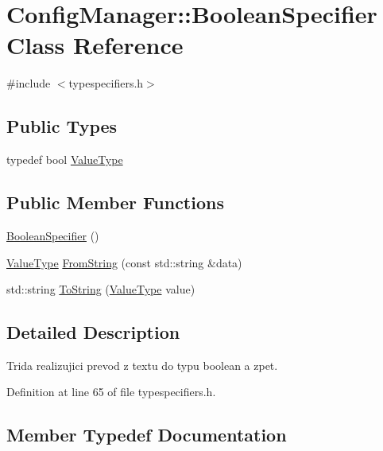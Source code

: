 \hypertarget{class_config_manager_1_1_boolean_specifier}{}\section{Config\+Manager\+:\+:Boolean\+Specifier Class Reference}
\label{class_config_manager_1_1_boolean_specifier}


{\ttfamily \#include $<$typespecifiers.\+h$>$}

\subsection*{Public Types}
\begin{DoxyCompactItemize}
\item 
typedef bool \hyperlink{class_config_manager_1_1_boolean_specifier_a765f3a2d8461a647ba1a84434665b54b}{Value\+Type}
\end{DoxyCompactItemize}
\subsection*{Public Member Functions}
\begin{DoxyCompactItemize}
\item 
\hyperlink{class_config_manager_1_1_boolean_specifier_ab8c8434a5de2cccb032cb6c7fbf3ae1c}{Boolean\+Specifier} ()
\item 
\hyperlink{class_config_manager_1_1_boolean_specifier_a765f3a2d8461a647ba1a84434665b54b}{Value\+Type} \hyperlink{class_config_manager_1_1_boolean_specifier_aa2964b687c6614053a9441b8f16eadcd}{From\+String} (const std\+::string \&data)
\item 
std\+::string \hyperlink{class_config_manager_1_1_boolean_specifier_a79947088ce64f51e90b42fc27587e503}{To\+String} (\hyperlink{class_config_manager_1_1_boolean_specifier_a765f3a2d8461a647ba1a84434665b54b}{Value\+Type} value)
\end{DoxyCompactItemize}


\subsection{Detailed Description}
Trida realizujici prevod z textu do typu boolean a zpet. 

Definition at line 65 of file typespecifiers.\+h.



\subsection{Member Typedef Documentation}
